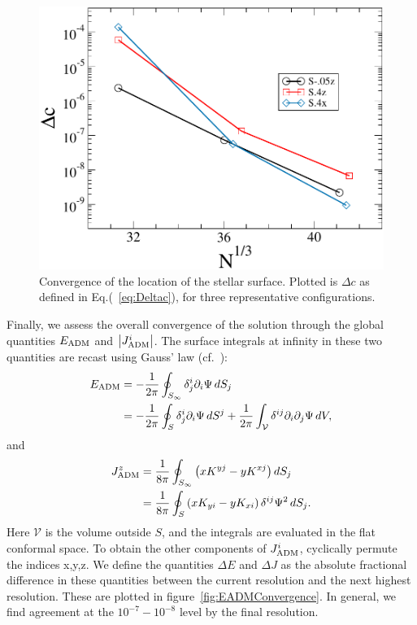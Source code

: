 {\begin{figure}
\includegraphics[width=0.95\columnwidth]{chap2/ClmDif}
\caption[Convergence of the location of the stellar surface.]{{\label{fig:ClmDif} Convergence of the location of the stellar surface}.
  Plotted is $\Delta c$ as defined in Eq.(~\ref{eq:Deltac}), for three representative configurations.}
\end{figure}

Finally, we assess the overall convergence of the solution through
the global quantities $E_{\rm ADM}$ and $\left|J^i_{\rm ADM}\right|$.
The surface integrals at infinity in these two quantities are recast using Gauss' law (cf.~\cite{FoucartEtAl:2008}):
\begin{align}
E_{\rm ADM} &= -\frac{1}{2\pi}\oint_{S_{\infty}}\delta^i_j\partial_i\Psi\, dS_j\nonumber \\
&= -\frac{1}{2\pi}\oint_{S}\delta^i_j \partial_i\Psi\, dS^j  +\frac{1}{2\pi}\int_{\mathcal{V}}\delta^{ij}\partial_i\partial_j\Psi\,dV,
\end{align}
and
\begin{align}
J^{z}_{\rm ADM} 
& = \frac{1}{8\pi}\oint_{S_{\infty}}\left(xK^{yj}-y K^{xj}\right)dS_j\nonumber\\
& = \frac{1}{8\pi}\oint_{S}\left(xK_{yi}-yK_{xi}\right)\delta^{ij}\Psi^2\,dS_j.
\end{align}
Here $\mathcal V$ is the volume outside $S$, and the integrals are evaluated in the flat conformal space.  To obtain the other components of $J_{\rm ADM}^i$, cyclically permute the indices x,y,z.
 We define the quantities $\Delta E$ and $\Delta J$ as the absolute fractional difference in these quantities between the current resolution and the next highest resolution. These are plotted in figure~\ref{fig:EADMConvergence}.   
In general, we find
agreement at the $10^{-7}-10^{-8}$ level by the final
resolution.

}
